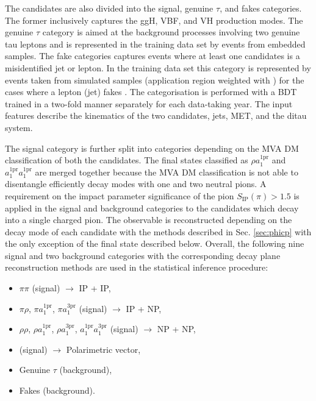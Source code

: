 The \tata candidates are also divided into the signal, genuine $\tau$, and fakes categories. The former inclusively captures the ggH, VBF, and VH production modes. The genuine $\tau$ category is aimed at the background processes involving two genuine tau leptons and is represented in the training data set by events from embedded samples. The fake categories captures events where at least one \tauh candidates is a misidentified jet or lepton. In the training data set this category is represented by events taken from simulated samples (application region weighted with \ff) for the cases where a lepton (jet) fakes \tauh. The categorisation is performed with a BDT trained in a two-fold manner separately for each data-taking year. The input features describe the kinematics of the two \tauh candidates, jets, MET, and the ditau system. 

The signal category is further split into categories depending on the MVA DM classification of both the \tauh candidates. The final states classified as $\rho a_1^\text{1pr}$ and $a_1^\text{1pr} a_1^\text{1pr}$ are merged together because the MVA DM classification is not able to disentangle efficiently decay modes with one and two neutral pions. A requirement on the impact parameter significance of the pion $S_\text{IP}(\pi) > 1.5$ is applied in the signal and background categories to the \tauh candidates which decay into a single charged pion. The \phicp observable is reconstructed depending on the decay mode of each \tauh candidate with the methods described in Sec. \ref{sec:phicp} with the only exception of the \aaa final state described below. Overall, the following nine signal and two background categories with the corresponding decay plane reconstruction methods are used in the statistical inference procedure:

\begin{itemize}
    \item $\pi\pi$ (signal) $\longrightarrow$ IP + IP,
    \item $\pi\rho$, $\pi a_1^\text{1pr}$, $\pi a_1^\text{3pr}$ (signal) $\longrightarrow$ IP + NP,
    \item $\rho \rho$, $\rho a_1^\text{1pr}$, $\rho a_1^\text{3pr}$, $a_1^\text{1pr} a_1^\text{3pr}$ (signal) $\longrightarrow$ NP + NP,
    \item \aaa (signal) $\longrightarrow$ Polarimetric vector,
    \item Genuine $\tau$ (background),
    \item Fakes (background).
\end{itemize}

